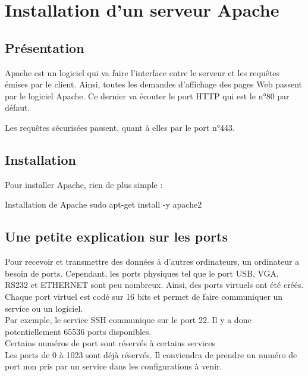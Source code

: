 \chapter{Installation d'un serveur Apache}

\section{Présentation} \label{apache}

Apache est un logiciel qui va faire l’interface entre le serveur et les requêtes émises par le client. Ainsi, toutes les demandes d’affichage des pages Web passent par le logiciel Apache.
Ce dernier va écouter le port HTTP qui est le n°80 par défaut. \\


Les requêtes sécurisées passent, quant à elles par le port n°443. \\

\section{Installation}
Pour installer Apache, rien de plus simple :
\begin{Bash}{Installation de Apache}
sudo apt-get install -y apache2
\end{Bash}


\section{Une petite explication sur les ports}

Pour recevoir et transmettre des données à d’autres ordinateurs, un ordinateur a besoin de ports. Cependant, les ports physiques tel que le port USB, VGA, RS232 et ETHERNET sont peu nombreux. Ainsi, des ports virtuels ont été créés. \\

Chaque port virtuel est codé sur 16 bits et permet de faire communiquer un service ou un logiciel.\\
Par exemple, le service SSH communique sur le port 22. 
Il y a donc potentiellement 65536 ports disponibles. \\
Certains numéros de port sont réservés à certains services \\
Les ports de 0 à 1023 sont déjà réservés. Il conviendra de prendre un numéro de port non pris par un service dans les configurations à venir. \\

